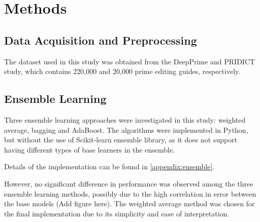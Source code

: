 \section{Methods}

\subsection*{Data Acquisition and Preprocessing}

The dataset used in this study was obtained from the DeepPrime and PRIDICT study\cite{mathisMachineLearningPrediction2024,yuPredictionEfficienciesDiverse2023}, which contains 220,000 and 20,000 prime editing guides, respectively. 

\subsection*{Ensemble Learning}

Three ensemble learning approaches were investigated in this study: weighted average, bagging and AdaBoost. The algorithms were implemented in Python, but without the use of Scikit-learn ensemble library, as it does not support having different types of base learners in the ensemble.  

Details of the implementation can be found in \autoref{appendix:ensemble}.

However, no significant difference in performance was observed among the three ensemble learning methods, possibly due to the high correlation in error between the base models (Add figure here). The weighted average method was chosen for the final implementation due to its simplicity and ease of interpretation.
